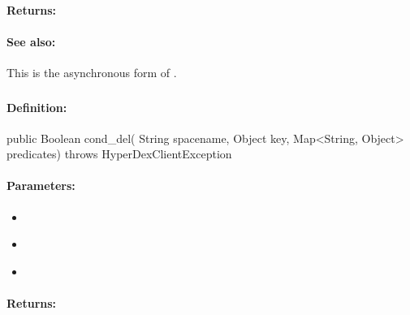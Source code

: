 \paragraph{Returns:}


\paragraph{See also:}  This is the asynchronous form of .

\pagebreak
\subsubsection{}
\label{api:java:cond_del}


\paragraph{Definition:}
\begin{javacode}
public Boolean cond_del(
        String spacename,
        Object key,
        Map<String, Object> predicates) throws HyperDexClientException
\end{javacode}

\paragraph{Parameters:}
\begin{itemize}[noitemsep]
\item {}\\

\item {}\\

\item {}\\

\end{itemize}

\paragraph{Returns:}


\pagebreak
\subsubsection{}
\label{api:java:async_cond_del}


